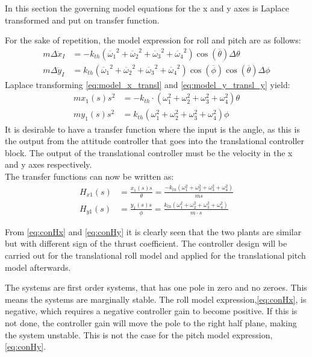 In this section the governing model equations for the x and y axes is Laplace transformed and put on transfer function. 

For the sake of repetition, the model expression for roll and pitch are as follows:
\begin{align}
m\Delta\ddot{x}_I&= -k_{th}({\overline{\omega}_1}^2+{\overline{\omega}_2}^2+{\overline{\omega}_3}^2+{\overline{\omega}_4}^2)\cos(\overline{\theta})\Delta\theta\\
\label{eq:model_x_transl}
m\Delta\ddot{y}_I&= k_{th}({\overline{\omega}_1}^2+{\overline{\omega}_2}^2+{\overline{\omega}_3}^2+{\overline{\omega}_4}^2)\cos(\overline{\phi})\cos(\overline{\theta})\Delta\phi
\label{eq:model_y_transl}
\end{align} 
Laplace transforming \autoref{eq:model_x_transl} and \ref{eq:model_y_transl_y} yield:
\begin{align}
m x_1(s)s^2&=-k_{th}\cdot (\omega_1 ^2 + \omega_2 ^2 + \omega_3 ^2 + \omega_4 ^2) \theta\\
m y_1(s) s^2&= k_{th} (\omega_1 ^2 + \omega_2 ^2 + \omega_3 ^2 + \omega_4 ^2)\phi
\end{align}
It is desirable to have a transfer function where the input is the angle, as this is the output from the attitude controller that goes into the translational controller block. The output of the translational controller must be the velocity in the x and y axes respectively. \\
The transfer functions can now be written as:
\begin{align}
H_{x1}(s)&=\frac{x_1(s) s}{\theta}=\frac{-k_{th} (\omega_1 ^2 + \omega_2 ^2 + \omega_3 ^2 + \omega_4 ^2)}{m s}\label{eq:conHx}\\
H_{y1}(s)&=\frac{y_1(s) s}{\phi}=\frac{k_{th}(\omega_1 ^2 + \omega_2 ^2 + \omega_3 ^2 + \omega_4 ^2)}{m\cdot s}\label{eq:conHy}
\end{align}
\begin{where}
\end{where}

From \autoref{eq:conHx} and \ref{eq:conHy} it is clearly seen that the two plants are similar but with different sign of the thrust coefficient. The controller design will be carried out for the translational roll model and applied for the translational pitch model  afterwards.

The systems are first order systems, that has one pole in zero and no zeroes. This means the systems are marginally stable. The roll model expression,\autoref{eq:conHx}, is negative, which requires a negative controller gain to become positive. If this is not done, the controller gain will move the pole to the right half plane, making the system unstable. This is not the case for the pitch model expression, \autoref{eq:conHy}.  


